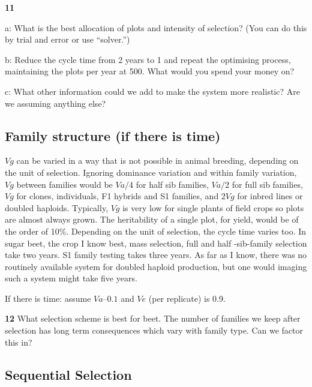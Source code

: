 \documentclass[
]{book}
\makeatletter
\newenvironment{kframe}{%
\medskip{}
\setlength{\fboxsep}{.8em}
 \def\at@end@of@kframe{}%
 \ifinner\ifhmode%
  \def\at@end@of@kframe{\end{minipage}}%
  \begin{minipage}{\columnwidth}%
 \fi\fi%
 \def\FrameCommand##1{\hskip\@totalleftmargin \hskip-\fboxsep
 \colorbox{shadecolor}{##1}\hskip-\fboxsep
     \hskip-\linewidth \hskip-\@totalleftmargin \hskip\columnwidth}%
 \MakeFramed {\advance\hsize-\width
   \@totalleftmargin\z@ \linewidth\hsize
   \@setminipage}}%
 {\par\unskip\endMakeFramed%
 \at@end@of@kframe}
\newenvironment{rmdblock}[1]
  {
  \begin{itemize}
  \renewcommand{\labelitemi}{
    \raisebox{-.7\height}[0pt][0pt]{
      {\setkeys{Gin}{width=3em,keepaspectratio}\texttt{[image: images/\#1]}}
    }
  }
  \setlength{\fboxsep}{1em}
  \begin{kframe}
  \item
  }
  {
  \end{kframe}
  \end{itemize}
  }
\newenvironment{rmdquiz}
  {\begin{rmdblock}{quiz}}
  {\end{rmdblock}}
\makeatother
\begin{document}
\begin{rmdquiz}
\textbf{11}

a: What is the best allocation of plots and intensity of selection? (You can do this by trial and error or use ``solver.'')

b: Reduce the cycle time from 2 years to 1 and repeat the optimising process, maintaining the plots per year at 500. What would you spend your money on?

c: What other information could we add to make the system more realistic? Are we assuming anything else?
\end{rmdquiz}

\hypertarget{family-structure-if-there-is-time}{%
\subsection{Family structure (if there is time)}\label{family-structure-if-there-is-time}}

\(Vg\) can be varied in a way that is not possible in animal breeding, depending on the unit of selection. Ignoring dominance variation and within family variation, \(Vg\) between families would be \(Va/4\) for half sib families, \(Va/2\) for full sib families, \(Vg\) for clones, individuals, F1 hybrids and S1 families, and \(2Vg\) for inbred lines or doubled haploids. Typically, \(Vg\) is very low for single plants of field crops so plots are almost always grown. The heritability of a single plot, for yield, would be of the order of 10\%. Depending on the unit of selection, the cycle time varies too. In sugar beet, the crop I know best, mass selection, full and half -sib-family selection take two years. S1 family testing takes three years. As far as I know, there was no routinely available system for doubled haploid production, but one would imaging such a system might take five years.

If there is time: assume \(Va – 0.1\) and \(Ve\) (per replicate) is 0.9.

\begin{rmdquiz}
\textbf{12}
What selection scheme is best for beet. The number of families we keep after selection has long term consequences which vary with family type. Can we factor this in?
\end{rmdquiz}

\hypertarget{sequential-selection}{%
\subsection{Sequential Selection}\label{sequential-selection}}
\end{document}
